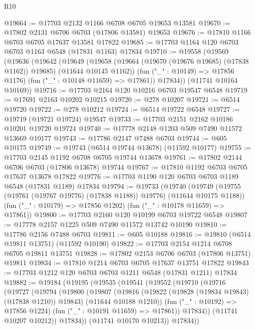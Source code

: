 \begin{lexlean}{R10}
\begin{coremodule}
{{{{{{{{{{{{{{{{{{{{{{{{{{{{{{{{{{{{{{{{{{{{{{{{{{{{{{{{{{{{{{{{{{{{{{{{{{{{{{{{{{{{@19664 := @17703 @2132 @1166 @6708 @6705 @19653 @13581
@19670 := @17802 @2131 @6706 @6703 (@17806 @13581) @19653
@19676 := @17810 @1166 @6703 @6705 @17637 @13581 @17822
@19685 := @17703 @1164 @120 @6703 @6703 @1163 @6548 (@17831 @1163) @17834
@19710 := @19558
    (@19569
      (@19636
        (@19642
          (@19649
            (@19658 (@19664 (@19670 (@19676 @19685) (@17838 @1162)) @19685) (@11644 @10145 @1162))
            (fun ("_" : @10149) => @17856 @1176)
            (fun ("_" : @10148 @11659) => @17861))
          @17834))
      (@11741 @10164 @10169))
@19716 := @17703 @2164 @120 @10216 @6703 @19547 @6548
@19719 := @17691 @2163 @10202 @10215
@19720 := @278 @10207
@19721 := @6514 @19720
@19722 := @278 @10212
@19724 := @6514 @19722 @6548
@19727 := @19719 (@19721 @19724) @19547
@19733 := @17703 @2151 @2162 @10186 @10201 @19720 @19724
@19740 := @17778 @2148 @1203 @509 @7490 @11572 @13669 @10177
@19743 := @17786 @2147 @7488 @6703
@19744 := @605 @10175
@19749 := @19743 (@6514 @19744 @13678) (@11592 @10177)
@19755 := @17703 @2145 @1192 @6708 @6705 @19744 @13678
@19761 := @17802 @2144 @6706 @6703 (@17806 @13678) @19744
@19767 := @17810 @1192 @6703 @6705 @17637 @13678 @17822
@19776 := @17703 @1190 @120 @6703 @6703 @1189 @6548 (@17831 @1189) @17834
@19794 := @19733
    (@19740
      (@19749 (@19755 (@19761 (@19767 @19776) (@17838 @1188)) @19776) (@11644 @10175 @1188))
      (fun ("_" : @10179) => @17856 @1202)
      (fun ("_" : @10178 @11659) => @17861))
@19800 := @17703 @2160 @120 @10199 @6703 @19722 @6548
@19807 := @17778 @2157 @1225 @509 @7490 @11572 @13742 @10190
@19810 := @17786 @2156 @7488 @6703
@19811 := @605 @10188
@19816 := @19810 (@6514 @19811 @13751) (@11592 @10190)
@19822 := @17703 @2154 @1214 @6708 @6705 @19811 @13751
@19828 := @17802 @2153 @6706 @6703 (@17806 @13751) @19811
@19834 := @17810 @1214 @6703 @6705 @17637 @13751 @17822
@19843 := @17703 @1212 @120 @6703 @6703 @1211 @6548 (@17831 @1211) @17834
@19882 := @19184
    (@19195
      (@19535
        (@19541
          (@19552
            (@19710
              (@19716
                (@19727
                  (@19794
                    (@19800
                      (@19807
                        (@19816
                          (@19822 (@19828 (@19834 @19843) (@17838 @1210)) @19843)
                          (@11644 @10188 @1210))
                        (fun ("_" : @10192) => @17856 @1224)
                        (fun ("_" : @10191 @11659) => @17861))
                      @17834))
                  (@11741 @10207 @10212))
                @17834))
            (@11741 @10170 @10213))
          @17834))
}}}}}}}}}}}}}}}}}}}}}}}}}}}}}}}}}}}}}}}}}}}}}}}}}}}}}}}}}}}}}}}}}}}}}}}}}}}}}}}}}}}}
\end{coremodule}
\end{lexlean}
